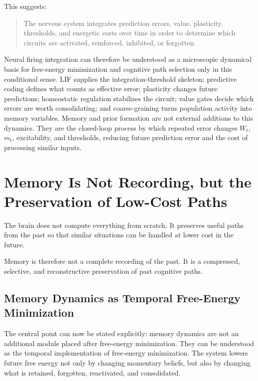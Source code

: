 \documentclass[11pt, a4paper]{article}
\begin{document}
This suggests:
\begin{quote}
The nervous system integrates prediction errors, value, plasticity, thresholds, and energetic costs over time in order to determine which circuits are activated, reinforced, inhibited, or forgotten.
\end{quote}

Neural firing integration can therefore be understood as a microscopic dynamical basis for free-energy minimization and cognitive path selection only in this conditional sense. LIF supplies the integration-threshold skeleton; predictive coding defines what counts as effective error; plasticity changes future predictions; homeostatic regulation stabilizes the circuit; value gates decide which errors are worth consolidating; and coarse-graining turns population activity into memory variables. Memory and prior formation are not external additions to this dynamics. They are the closed-loop process by which repeated error changes $W_t$, $m_t$, excitability, and thresholds, reducing future prediction error and the cost of processing similar inputs.

\section{Memory Is Not Recording, but the Preservation of Low-Cost Paths}

The brain does not compute everything from scratch. It preserves useful paths from the past so that similar situations can be handled at lower cost in the future.

Memory is therefore not a complete recording of the past. It is a compressed, selective, and reconstructive preservation of past cognitive paths.

\subsection{Memory Dynamics as Temporal Free-Energy Minimization}

The central point can now be stated explicitly: memory dynamics are not an additional module placed after free-energy minimization. They can be understood as the temporal implementation of free-energy minimization. The system lowers future free energy not only by changing momentary beliefs, but also by changing what is retained, forgotten, reactivated, and consolidated.
\end{document}
